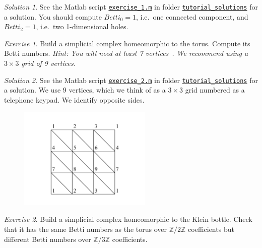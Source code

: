 \documentclass[amscd, amssymb, verbatim]{amsart}[12pt]
\theoremstyle{remark}
\theoremstyle{remark}
\newtheorem{exerciseSol}{Exercise}
\theoremstyle{remark}
\newtheorem*{solution}{Solution}
\newcommand{\Z}{\mathbb{Z}}
\begin{document}
\begin{solution}
See the Matlab script \href{https://github.com/appliedtopology/javaplex/tree/master/src/matlab/for_distribution/tutorial_solutions/exercise_1.m}{\texttt{exercise\_1.m}} in folder \href{https://github.com/appliedtopology/javaplex/tree/master/src/matlab/for_distribution/tutorial_solutions}{\texttt{tutorial\_solutions}} for a solution. You should compute $Betti_0=1$, i.e.\ one connected component, and $Betti_2=1$, i.e.\ two 1-dimensional holes.
\end{solution}

\begin{exerciseSol}
Build a simplicial complex homeomorphic to the torus. Compute its Betti numbers. {\em Hint: You will need at least 7 vertices}~\citep[page 107]{Hatcher}{\em . We recommend using a $3\times 3$ grid of 9 vertices.}
\end{exerciseSol}

\begin{solution}
See the Matlab script \href{https://github.com/appliedtopology/javaplex/tree/master/src/matlab/for_distribution/tutorial_solutions/exercise_2.m}{\texttt{exercise\_2.m}} in folder \href{https://github.com/appliedtopology/javaplex/tree/master/src/matlab/for_distribution/tutorial_solutions}{\texttt{tutorial\_solutions}} for a solution. We use 9 vertices, which we think of as a $3 \times 3$ grid numbered as a telephone keypad. We identify opposite sides.
\end{solution}

\begin{figure}[htp]
  \begin{center}
    \includegraphics[width=2.5in]{torus}
   \end{center}
\end{figure}
\FloatBarrier

\begin{exerciseSol}
Build a simplicial complex homeomorphic to the Klein bottle. Check that it has the same Betti numbers as the torus over $\Z/2\Z$ coefficients but different Betti numbers over $\Z/3\Z$ coefficients.
\end{exerciseSol}
\end{document}
